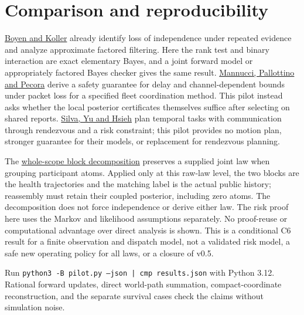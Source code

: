 \documentclass[11pt]{article}
\begin{document}
\section{Comparison and reproducibility}
\href{https://ai.stanford.edu/~koller/Papers/Boyen%2BKoller%3AUAI98.pdf}{Boyen and Koller} already identify loss of independence under repeated evidence and analyze approximate factored filtering. Here the rank test and binary interaction are exact elementary Bayes, and a joint forward model or appropriately factored Bayes checker gives the same result. \href{https://www.centropiaggio.unipi.it/sites/default/files/provably_safe_multi_robot_coordination_with_unreliable_communication.pdf}{Mannucci, Pallottino and Pecora} derive a safety guarantee for delay and channel-dependent bounds under packet loss for a specified fleet coordination method. This pilot instead asks whether the local posterior certificates themselves suffice after selecting on shared reports. \href{https://doi.org/10.1007/s10514-025-10231-6}{Silva, Yu and Hsieh} plan temporal tasks with communication through rendezvous and a risk constraint; this pilot provides no motion plan, stronger guarantee for their models, or replacement for rendezvous planning.

The \href{https://github.com/eternal-november/eos-research-programmes/blob/e1348964f73704212d2d8b48d5982a5ed600a2ff/projects/contextual-composition/foundations/shared-world-native-assembly/Whole_Scope_Block_Decomposition.tex\#L30-L47}{whole-scope block decomposition} preserves a supplied joint law when grouping participant atoms. Applied only at this raw-law level, the two blocks are the health trajectories and the matching label is the actual public history; reassembly must retain their coupled posterior, including zero atoms. The decomposition does not force independence or derive either law. The risk proof here uses the Markov and likelihood assumptions separately. No proof-reuse or computational advantage over direct analysis is shown. This is a conditional C6 result for a finite observation and dispatch model, not a validated risk model, a safe new operating policy for all laws, or a closure of v0.5.

Run \texttt{python3 -B pilot.py --json | cmp results.json} with Python 3.12. Rational forward updates, direct world-path summation, compact-coordinate reconstruction, and the separate survival cases check the claims without simulation noise.
\end{document}
